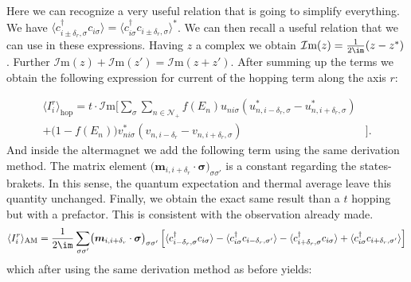 \documentclass[../main.tex]{subfile}
\begin{document}
Here we can recognize a very useful relation that is going to simplify everything. We have $\langle c_{i\pm\delta_r,\sigma}^{\dagger} c_{i\sigma}\rangle = \langle c_{i\sigma}^{\dagger}c_{i\pm\delta_{r},\sigma} \rangle^{\ast}$.
We can then recall a useful relation that we can use in these expressions. Having $z$ a complex we obtain $\mathcal{I}\text{m}(z) = \frac{1}{2\im}(z-z^{\ast})$. Further $\mathcal{I}\text{m}(z)+\mathcal{I}\text{m}(z') = \mathcal{I}\text{m}(z+z')$.
After summing up the terms we obtain the following expression for current of the hopping term along the axis $r$:

\begin{equation}
    \begin{aligned}
        \langle I_i^r\rangle_{\text{hop}} = t\cdot\mathcal{I}\text{m}\biggl[ \sum_{\sigma}\sum_{n\in\mathcal{N}_+} 
            f(E_n)u_{ni\sigma}\left(u_{n,i-\delta_r,\sigma}^{\ast} - u_{n,i+\delta_r,\sigma}^{\ast}\right) &\\
            +\bigl(1-f(E_n)\bigr) v_{ni\sigma}^{\ast}\left(v_{n,i-\delta_r} - v_{n,i+\delta_r,\sigma}\right)&\biggr].
    \end{aligned}
\end{equation}
And inside the altermagnet we add the following term using the same derivation method. The matrix element $\bigl(\bm{m}_{i,i+\delta_r}\cdot\bm{\sigma}\bigr)_{\sigma\sigma'}$ is a constant regarding
the states-brakets. In this sense, the quantum expectation and thermal average leave this quantity unchanged. Finally, we obtain the exact
same result than a $t$ hopping but with a prefactor. This is consistent with the observation already made.
\begin{equation*}
    \begin{aligned}
    \langle I_i^r\rangle_{\text{AM}} = \frac{1}{2\im}\sum_{\sigma\sigma'}\bigl(\bm{m}_{i,i+\delta_r}\cdot\bm{\sigma}\bigr)_{\sigma\sigma'}\left[
        \langle c_{i-\delta_{r},\sigma}^{\dagger} c_{i\sigma}\rangle
        -\langle c_{i\sigma}^{\dagger}            c_{i-\delta_{r},\sigma'}\rangle
        -\langle c_{i+\delta_{r},\sigma}^{\dagger} c_{i\sigma}\rangle
        +\langle c_{i\sigma}^{\dagger}            c_{i+\delta_{r},\sigma'}\rangle\right]
\end{aligned}
\end{equation*}
which after using the same derivation method as before yields:
\end{document}
